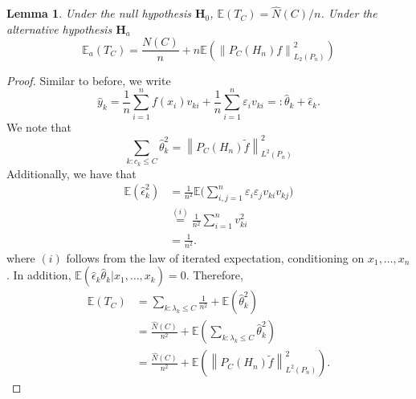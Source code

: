 \documentclass{article}
\newcommand{\norm}[1]{\left\lVert#1\right\rVert}
\newcommand{\1}{\mathbb{I}}
\newcommand{\Ebb}{\mathbb{E}}
\theoremstyle{alden}
\theoremstyle{aldenthm}
\newtheorem{lemma}{Lemma}
\theoremstyle{definition}
\theoremstyle{remark}
\begin{document}
\begin{lemma}
	Under the null hypothesis $\mathbf{H}_0$, $\Ebb(T_C) = \widehat{N}(C)/n$. Under the alternative hypothesis $\mathbf{H}_a$
	\begin{equation*}
	\Ebb_a(T_C) = \frac{N(C)}{n} + n \Ebb\left(\norm{P_C(H_n)f}_{L_2(P_n)}^2\right)
	\end{equation*}
\end{lemma}
\begin{proof}
	Similar to before, we write
	\begin{equation*}
	\widehat{y}_k = \frac{1}{n}\sum_{i = 1}^{n} f(x_i) v_{ki} + \frac{1}{n} \sum_{i = 1}^{n} \varepsilon_i v_{ki} =: \widehat{\theta}_k + \widehat{\epsilon}_k.
	\end{equation*}
	We note that
	\begin{equation*}
	\sum_{k:c_k \leq C} \widehat{\theta}_k^2 = \norm{P_C(H_n)\widetilde{f}}_{L^2(P_n)}^2
	\end{equation*}
	Additionally, we have that
	\begin{align*}
	\Ebb(\widehat{\epsilon}_k^2) & = \frac{1}{n^2}\Ebb\bigl(\sum_{i,j = 1}^{n} \varepsilon_i \varepsilon_j v_{ki} v_{kj}\bigr) \\
	& \overset{(i)}{=} \frac{1}{n^2} \sum_{i = 1}^{n} v_{ki}^2 \\
	& = \frac{1}{n^2}.
	\end{align*}
	where $(i)$ follows from the law of iterated expectation, conditioning on $x_1,\ldots, x_n$. In addition, $\Ebb(\widehat{\epsilon}_k\widehat{\theta}_k | x_1,\ldots,x_k) = 0.$ Therefore,
	\begin{align*}
	\Ebb(T_C) & = \sum_{k:\lambda_k \leq C} \frac{1}{n^2} + \Ebb(\widehat{\theta}_k^2) \\
	& = \frac{\widehat{N}(C)}{n^2} + \Ebb \left(\sum_{k:\lambda_k \leq C} \widehat{\theta}_k^2\right) \\
	& = \frac{\widehat{N}(C)}{n^2}  + \Ebb \left(\norm{P_C(H_n)\widetilde{f}}_{L^2(P_n)}^2\right).
	\end{align*}
\end{proof}
\end{document}
